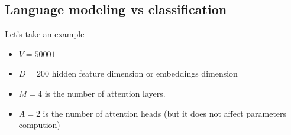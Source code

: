 \documentclass[a4paper]{article}
\begin{document}
\break


\subsection*{Language modeling vs classification}


Let's take an example
\begin{itemize}
    \item $V= 50001$
    \item $D= 200$ hidden feature dimension or embeddings dimension
    \item $M= 4$ is the number of attention layers.
    \item $A= 2$ is the number of attention heads (but it does not affect parameters compution)
\end{itemize}
\end{document}
